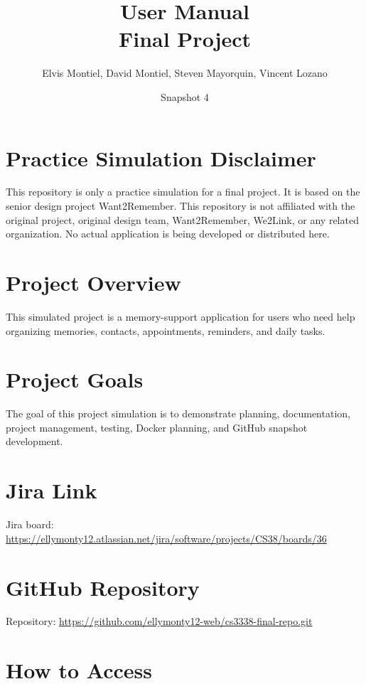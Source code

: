 \documentclass{article}
\title{User Manual\\Final Project}
\author{Elvis Montiel, David Montiel, Steven Mayorquin, Vincent Lozano}
\date{Snapshot 4}
\begin{document}
\maketitle
\tableofcontents
\newpage

\section{Practice Simulation Disclaimer}

This repository is only a practice simulation for a final project. It is based on the senior design project Want2Remember. This repository is not affiliated with the original project, original design team, Want2Remember, We2Link, or any related organization. No actual application is being developed or distributed here.

\section{Project Overview}

This simulated project is a memory-support application for users who need help organizing memories, contacts, appointments, reminders, and daily tasks.

\section{Project Goals}

The goal of this project simulation is to demonstrate planning, documentation, project management, testing, Docker planning, and GitHub snapshot development.

\section{Jira Link}

Jira board: \url{https://ellymonty12.atlassian.net/jira/software/projects/CS38/boards/36}

\section{GitHub Repository}

Repository: \url{https://github.com/ellymonty12-web/cs3338-final-repo.git}

\section{How to Access}
\end{document}
